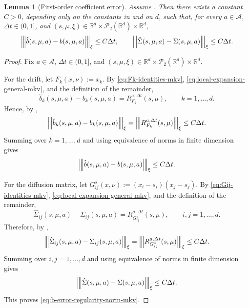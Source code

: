 \documentclass[a4paper, 10pt, english, reqno]{amsart}
\def\R{\mathbb R}
\newcommand{\tnorm}[1]{\left\vert\kern-0.25ex\left\vert\kern-0.25ex\left\vert #1
\right\vert\kern-0.25ex\right\vert\kern-0.25ex\right\vert}
\newtheorem{lemma}[theorem]{Lemma}
\begin{document}
\begin{lemma}[First-order coefficient error]
\label{lem:first-order-coeff-error-regularity-norm-mkv}
Assume . Then there exists a constant
$C>0$, depending only on the constants in 
and on $d$, such that, for every $a\in\mathcal A$, $\Delta t\in(0,1]$,
and $(s,\mu,\xi)\in\R^d\times\mathcal P_2(\R^d)\times\R^d$,
\begin{equation}
\label{eq:b-error-regularity-norm-mkv}
\tnorm{\hat b(s,\mu,a)-b(s,\mu,a)}_{\xi}\le C\Delta t,
\qquad
\tnorm{\hat\Sigma(s,\mu,a)-\Sigma(s,\mu,a)}_{\xi}\le C\Delta t.
\end{equation}
\end{lemma}

\begin{proof}
Fix $a\in\mathcal A$, $\Delta t\in(0,1]$, and
$(s,\mu,\xi)\in\R^d\times\mathcal P_2(\R^d)\times\R^d$.

For the drift, let $F_k(x,\nu):=x_k$. By
\eqref{eq:Fk-identities-mkv}, \eqref{eq:local-expansion-general-mkv},
and the definition of the remainder,
\[
\hat b_k(s,\mu,a)-b_k(s,\mu,a)
=
R_{F_k}^{a,\Delta t}(s,\mu),
\qquad k=1,\dots,d.
\]
Hence, by ,
\[
\tnorm{\hat b_k(s,\mu,a)-b_k(s,\mu,a)}_{\xi}
=
\tnorm{R_{F_k}^{a,\Delta t}(s,\mu)}_{\xi}
\le C\Delta t.
\]
Summing over $k=1,\dots,d$ and using equivalence of norms in finite
dimension gives
\[
\tnorm{\hat b(s,\mu,a)-b(s,\mu,a)}_{\xi}\le C\Delta t.
\]

For the diffusion matrix, let
$G_{ij}^s(x,\nu):=(x_i-s_i)(x_j-s_j)$. By
\eqref{eq:Gij-identities-mkv}, \eqref{eq:local-expansion-general-mkv},
and the definition of the remainder,
\[
\hat\Sigma_{ij}(s,\mu,a)-\Sigma_{ij}(s,\mu,a)
=
R_{G_{ij}^s}^{a,\Delta t}(s,\mu),
\qquad i,j=1,\dots,d.
\]
Therefore, by ,
\[
\tnorm{\hat\Sigma_{ij}(s,\mu,a)-\Sigma_{ij}(s,\mu,a)}_{\xi}
=
\tnorm{R_{G_{ij}^s}^{a,\Delta t}(s,\mu)}_{\xi}
\le C\Delta t.
\]
Summing over $i,j=1,\dots,d$ and using equivalence of norms in finite
dimension gives
\[
\tnorm{\hat\Sigma(s,\mu,a)-\Sigma(s,\mu,a)}_{\xi}\le C\Delta t.
\]
This proves \eqref{eq:b-error-regularity-norm-mkv}.
\end{proof}
\end{document}
